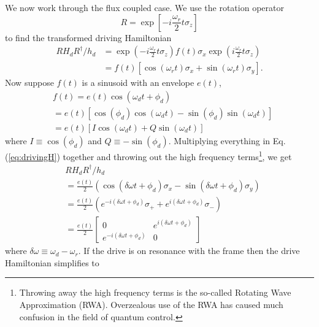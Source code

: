 We now work through the flux coupled case.
We use the rotation operator
\begin{equation*}
  R = \exp \left[ -i \frac{\omega_r}{2} t \sigma_z \right]
\end{equation*}
to find the transformed driving Hamiltonian \begin{align}
  RH_d R^{\dagger}/h_d
  &=
    \exp\left(-i \frac{\omega_r}{2} t \sigma_z \right)
    f(t) \sigma_x
    \exp\left( i \frac{\omega_r}{2} t \sigma_z \right) \nonumber \\
  &= f(t)
    \left[
      \cos\left(\omega_r t\right)\sigma_x + \sin\left(\omega_r t\right)\sigma_y
    \right]. \label{eq:drivingH}
\end{align}
Now suppose $f(t)$ is a sinusoid with an envelope $e(t)$,
\begin{align}
  & f(t)
    = e(t)\cos \left( \omega_d t + \phi_d \right) \nonumber \\
  &= e(t)
    \left[
      \cos(\phi_d) \cos(\omega_d t) - \sin(\phi_d) \sin(\omega_d t)
    \right] \nonumber \\
  &= e(t)
    \left[
      I \cos\left(\omega_d t\right) + Q \sin \left(\omega_d t\right)
    \right] \label{eq:drivingFunctionIQ}
\end{align}
where $I \equiv \cos(\phi_d)$ and $Q \equiv - \sin(\phi_d)$.
Multiplying everything in Eq. (\ref{eq:drivingH}) together and throwing out the high frequency terms\footnote{Throwing away the high frequency terms is the so-called Rotating Wave Approximation (RWA). Overzealous use of the RWA has caused much confusion in the field of quantum control.}, we get
\begin{align}
& RH_dR^{\dagger}/h_d \nonumber \\
  &= \frac{e(t)}{2}
  \left(
    \cos(\delta\omega t + \phi_d)\sigma_x - \sin(\delta\omega t + \phi_d)\sigma_y
  \right) \nonumber \\
  &= \frac{e(t)}{2}
  \left(
    e^{-i(\delta \omega t + \phi_d)} \sigma_+ + e^{i(\delta \omega t + \phi_d)} \sigma_-
  \right) \nonumber \\
  &= \frac{e(t)}{2}
  \left[ \begin{array}{cc}
    0 & e^{i(\delta\omega t + \phi_d)} \\
    e^{-i(\delta\omega t + \phi_d)} & 0
  \end{array} \right] \label{eq:drivingH_matrixForm}
\end{align}
where $\delta\omega \equiv \omega_d - \omega_r$.
If the drive is on resonance with the frame then the drive Hamiltonian simplifies to
